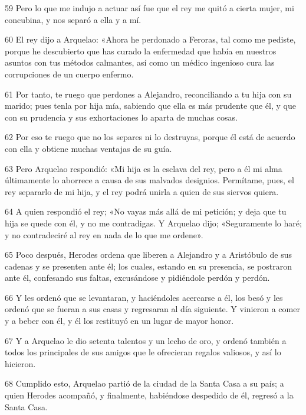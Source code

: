 \par 59 Pero lo que me indujo a actuar así fue que el rey me quitó a cierta mujer, mi concubina, y nos separó a ella y a mí.

\par 60 El rey dijo a Arquelao: «Ahora he perdonado a Feroras, tal como me pediste, porque he descubierto que has curado la enfermedad que había en nuestros asuntos con tus métodos calmantes, así como un médico ingenioso cura las corrupciones de un cuerpo enfermo.

\par 61 Por tanto, te ruego que perdones a Alejandro, reconciliando a tu hija con su marido; pues tenla por hija mía, sabiendo que ella es más prudente que él, y que con su prudencia y sus exhortaciones lo aparta de muchas cosas.

\par 62 Por eso te ruego que no los separes ni lo destruyas, porque él está de acuerdo con ella y obtiene muchas ventajas de su guía.

\par 63 Pero Arquelao respondió: «Mi hija es la esclava del rey, pero a él mi alma últimamente lo aborrece a causa de sus malvados designios. Permítame, pues, el rey separarlo de mi hija, y el rey podrá unirla a quien de sus siervos quiera.

\par 64 A quien respondió el rey; «No vayas más allá de mi petición; y deja que tu hija se quede con él, y no me contradigas. Y Arquelao dijo; «Seguramente lo haré; y no contradeciré al rey en nada de lo que me ordene».

\par 65 Poco después, Herodes ordena que liberen a Alejandro y a Aristóbulo de sus cadenas y se presenten ante él; los cuales, estando en su presencia, se postraron ante él, confesando sus faltas, excusándose y pidiéndole perdón y perdón.

\par 66 Y les ordenó que se levantaran, y haciéndoles acercarse a él, los besó y les ordenó que se fueran a sus casas y regresaran al día siguiente. Y vinieron a comer y a beber con él, y él los restituyó en un lugar de mayor honor.

\par 67 Y a Arquelao le dio setenta talentos y un lecho de oro, y ordenó también a todos los principales de sus amigos que le ofrecieran regalos valiosos, y así lo hicieron.

\par 68 Cumplido esto, Arquelao partió de la ciudad de la Santa Casa a su país; a quien Herodes acompañó, y finalmente, habiéndose despedido de él, regresó a la Santa Casa.

